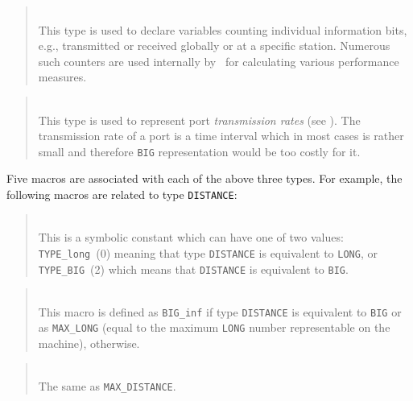 \begin{quote}
\noindent{}\\ \hspace{0in}
This type is used to declare variables counting individual information
bits, e.g., transmitted or received globally or at a specific station.
Numerous such counters are used internally by \smurph\ for calculating
various performance measures.
\end{quote}

\begin{quote}
\noindent{}\\ \hspace{0in}
This type is used to represent port {\em transmission rates\/}
(see ).
The transmission rate of a port is a time interval which in most cases
is rather small and therefore {\tt BIG} representation would be too costly
for it.
\end{quote}\medskip

Five macros are associated with each of the above three types.
For example, the following macros are related to type {\tt DISTANCE}:

\medskip

\begin{quote}
\noindent{}\\ \hspace{0in}
This is a symbolic constant which
can have one of two values: {\tt TYPE\_long}~(0) meaning that type
{\tt DISTANCE} is equivalent to {\tt LONG}, or {\tt TYPE\_BIG}~(2) which
means that {\tt DISTANCE} is equivalent to {\tt BIG}.
\end{quote}

\begin{quote}
\noindent{}\\ \hspace{0in}
This macro is defined as {\tt BIG\_inf} if type {\tt DISTANCE} is
equivalent to {\tt BIG} or as
{\tt MAX\_LONG} (equal to the maximum {\tt LONG} number
representable on the machine), otherwise.
\end{quote}

\begin{quote}
\noindent{}\\ \hspace{0in}
The same as {\tt MAX\_DISTANCE}.
\end{quote}


